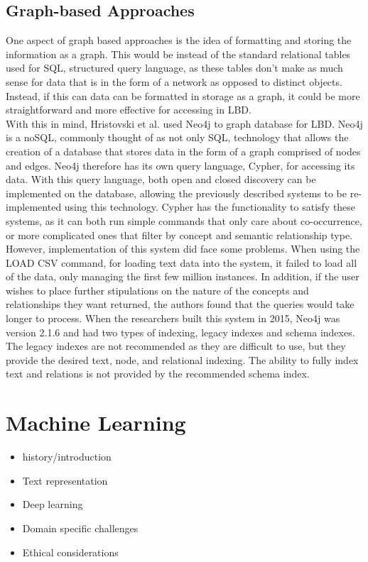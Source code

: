 \documentclass{l4proj}
\begin{document}
\subsection{Graph-based Approaches}

One aspect of graph based approaches is the idea of formatting and storing the information as a graph. This would be instead of the standard relational tables used for SQL, structured query language, as these tables don't make as much sense for data that is in the form of a network as opposed to distinct objects. Instead, if this can data can be formatted in storage as a graph, it could be more straightforward and more effective for accessing in LBD. \\

With this in mind, Hristovski et al. used Neo4j to graph database for LBD. Neo4j is a noSQL, commonly thought of as not only SQL, technology that allows the creation of a database that stores data in the form of a graph comprised of nodes and edges. Neo4j therefore has its own query language, Cypher, for accessing its data. With this query language, both open and closed discovery can be implemented on the database, allowing the previously described systems to be re-implemented using this technology. Cypher has the functionality to satisfy these systems, as it can both run simple commands that only care about co-occurrence, or more complicated ones that filter by concept and semantic relationship type. \\

However, implementation of this system did face some problems. When using the LOAD CSV command, for loading text data into the system, it failed to load all of the data, only managing the first few million instances. In addition, if the user wishes to place further stipulations on the nature of the concepts and relationships they want returned, the authors found that the queries would take longer to process. When the researchers built this system in 2015, Neo4j was version 2.1.6 and had two types of indexing, legacy indexes and schema indexes. The legacy indexes are not recommended as they are difficult to use, but they provide the desired text, node, and relational indexing. The ability to fully index text and relations is not provided by the recommended schema index. \\

\section{Machine Learning}
\begin{itemize}
    \item history/introduction
    \item Text representation
    \item Deep learning
    \item Domain specific challenges
    \item Ethical considerations
\end{itemize}
\end{document}
